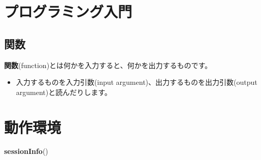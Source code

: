 \documentclass[]{bxjsarticle}
\newenvironment{Shaded}{\begin{snugshade}}{\end{snugshade}}
\newcommand{\KeywordTok}[1]{\textcolor[rgb]{0.13,0.29,0.53}{\textbf{#1}}}
\newcommand{\NormalTok}[1]{#1}
\providecommand{\tightlist}{%
  \setlength{\itemsep}{0pt}\setlength{\parskip}{0pt}}
\begin{document}
\hypertarget{intro-r}{%
\section{プログラミング入門}\label{intro-r}}

\hypertarget{ux95a2ux6570}{%
\subsection{関数}\label{ux95a2ux6570}}

\textbf{関数}(function)とは何かを入力すると、何かを出力するものです。

\begin{itemize}
\tightlist
\item
  入力するものを入力引数(input argument)、出力するものを出力引数(output argument)と読んだりします。
\end{itemize}

\hypertarget{environment}{%
\section*{動作環境}\label{environment}}

\begin{Shaded}
\begin{Highlighting}[]
\KeywordTok{sessionInfo}\NormalTok{()}
\end{Highlighting}
\end{Shaded}
\end{document}
